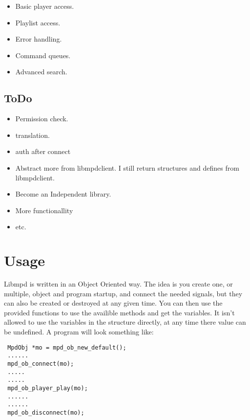 \documentclass[a4paper,11pt]{article}
\begin{document}
\begin{itemize}
  \item Basic player access.
  
  \item Playlist access.
  
  \item Error handling.
  
  \item Command queues.
  
  \item Advanced search.
\end{itemize}

\subsection{ToDo}
\begin{itemize}
  \item Permission check.
  
  \item translation.
  
  \item auth after connect
  
  \item Abstract more from libmpdclient. I still return structures and defines
  from libmpdclient.
  
  \item Become an Independent  library.
  
  \item More functionallity
  
  \item etc.
\end{itemize}

\section{Usage}
Libmpd is written in an Object Oriented way. The idea is you create one, or multiple, object and program startup, and connect the needed signals, but they can also be created or destroyed at any given time. 
You can then use the provided functions to use the availible methods and get the variables. It isn't allowed to use the variables in the structure directly, at any time there value can be undefined.
A program will look something like:
\begin{verbatim}
 MpdObj *mo = mpd_ob_new_default();
 ......
 mpd_ob_connect(mo);
 .....
 .....
 mpd_ob_player_play(mo);
 ......
 ......
 mpd_ob_disconnect(mo);
\end{verbatim}
\end{document}
